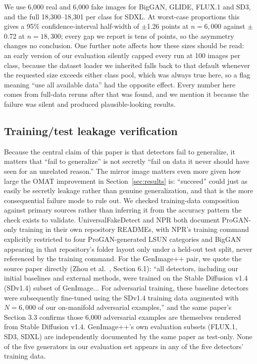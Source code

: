 \documentclass[3p,times,procedia]{elsarticle}
\begin{document}
We use 6{,}000 real and 6{,}000 fake images for BigGAN, GLIDE, FLUX.1 and
SD3, and the full 18{,}300--18{,}301 per class for SDXL. At worst-case
proportions this gives a 95\% confidence-interval half-width of $\pm$1.26
points at $n=6{,}000$ against $\pm$0.72 at $n=18{,}300$; every gap we
report is tens of points, so the asymmetry changes no conclusion. One
further note affects how these sizes should be read: an early version of
our evaluation silently capped every run at 100 images per class, because
the dataset loader we inherited falls back to that default whenever the
requested size exceeds either class pool, which was always true here, so a
flag meaning ``use all available data'' had the opposite effect. Every
number here comes from full-data reruns after that was found, and we
mention it because the failure was silent and produced plausible-looking
results.

\subsection{Training/test leakage verification}
\label{sec:methods-leakage}

Because the central claim of this paper is that detectors fail to
generalize, it matters that ``fail to generalize'' is not secretly ``fail
on data it never should have seen for an unrelated reason.'' The mirror
image matters even more given how large the OMAT improvement in
Section~\ref{sec:results} is: ``succeed'' could just as easily be secretly
leakage rather than genuine generalization, and that is the more
consequential failure mode to rule out. We
checked training-data composition against primary sources rather than
inferring it from the accuracy pattern the check exists to validate.
UniversalFakeDetect and NPR both document ProGAN-only training in their own
repository READMEs, with NPR's training command explicitly restricted to
four ProGAN-generated LSUN categories and BigGAN appearing in that
repository's folder layout only under a held-out test split, never
referenced by the training command. For the GenImage++ pair, we quote the
source paper directly (Zhou et al.~\cite{zhou2025omat}, Section 6.1):
``all detectors, including our initial baselines and external methods,
were trained on the Stable Diffusion v1.4 (SDv1.4) subset of GenImage...
For adversarial training, these baseline detectors were subsequently
fine-tuned using the SDv1.4 training data augmented with $N=6{,}000$ of our
on-manifold adversarial examples,'' and the same paper's Section 3.3
confirms those 6{,}000 adversarial examples are themselves rendered from
Stable Diffusion v1.4. GenImage++'s own evaluation subsets (FLUX.1, SD3,
SDXL) are independently documented by the same paper as test-only.
None of the five generators in our evaluation set appears in any of the
five detectors' training data.
\end{document}
